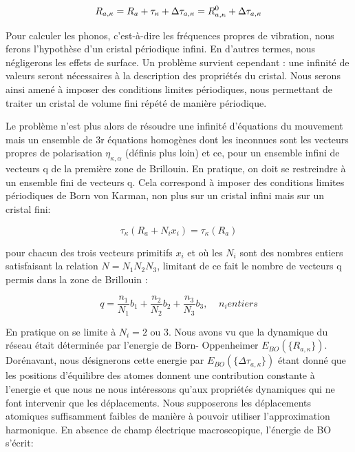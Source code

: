\documentclass[12pt,a4paper]{book}
\begin{document}
\begin{equation}
R_{a,\kappa} = R_{a}+ \tau_{\kappa} + \Delta\tau_{a,\kappa}\\
= R^{0}_{a,\kappa} + \Delta\tau_{a,\kappa}
\end{equation}

Pour calculer les phonos, c'est-à-dire les fréquences propres de vibration, nous ferons l'hypothèse d'un cristal périodique infini. En d'autres termes, nous négligerons les effets de surface. Un problème survient cependant : une infinité de valeurs seront nécessaires à la description des propriétés du cristal. Nous serons ainsi amené à imposer des conditions limites périodiques, nous permettant de traiter un cristal de volume fini répété de manière périodique. 

Le problème n'est plus alors de résoudre une infinité d'équations du mouvement mais un ensemble de 3r équations homogènes dont les inconnues sont les vecteurs propres de polarisation $\eta_{\kappa,\alpha}$ (définis plus loin) et ce, pour un ensemble infini de vecteurs q de la première zone de Brillouin. En pratique, on doit se restreindre à un ensemble fini de vecteurs q. Cela correspond à imposer des conditions limites périodiques de Born von Karman, non plus sur un cristal infini mais sur un cristal fini:

\begin{equation}
\tau_{\kappa}(R_{a} + N_{i}x_{i}) = \tau_{\kappa}(R_{a})
\end{equation}

pour chacun des trois vecteurs primitifs $x_{i}$ et où les $N_{i}$ sont des nombres entiers satisfaisant la relation $N=N_{1}N_{2}N_{3}$, limitant de ce fait le nombre de vecteurs q permis dans la zone de Brillouin :

\begin{equation}
q= \frac{n_{1}}{N_{1}}b_{1}+ \frac{n_{2}}{N_{2}}b_{2}+ \frac{n_{3}}{N_{3}}b_{3}, \; \; \; \;     n_{i}  entiers
\end{equation}

En pratique on se limite  à $N_{i} =2$ ou 3. Nous avons vu que la dynamique du réseau était déterminée par l'energie de Born- Oppenheimer $E_{BO}(\{R_{a,\kappa}\})$. Dorénavant, nous désignerons cette energie par $E_{BO}(\{\Delta\tau_{a,\kappa}\})$ étant donné que les positions d'équilibre des atomes donnent une contribution constante  à l'energie et que nous ne nous intéressons qu'aux propriétés dynamiques qui ne font intervenir que les déplacements. Nous supposerons les déplacements atomiques suffisamment faibles de manière à pouvoir utiliser l'approximation harmonique\cite{}. En absence de champ électrique macroscopique, l'énergie de BO s'écrit:
\end{document}
